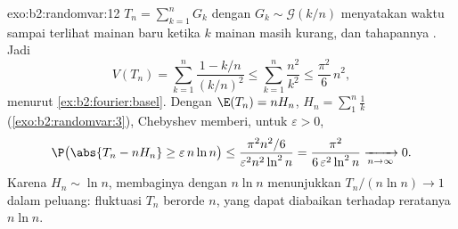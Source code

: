 \begin{solution}{exo:b2:randomvar:12}
$T_n = \sum_{k=1}^nG_k$ dengan $G_k \sim \mathcal G(k/n)$ menyatakan
waktu sampai terlihat mainan baru ketika $k$ mainan masih kurang, dan
tahapannya . Jadi
\[
V(T_n) = \sum_{k=1}^n\frac{1 - k/n}{(k/n)^2}
\leq \sum_{k=1}^n\frac{n^2}{k^2}
\leq \frac{\pi^2}6\,n^2 ,
\]
menurut \cref{ex:b2:fourier:basel}. Dengan $\E(T_n) = nH_n$, $H_n =
\sum_1^n\frac1k$ (\cref{exo:b2:randomvar:3}), Chebyshev memberi,
untuk $\varepsilon > 0$,
\[
\P\bigl(\abs{T_n - nH_n} \geq \varepsilon\,n\ln n\bigr)
\leq \frac{\pi^2n^2/6}{\varepsilon^2n^2\ln^2 n}
= \frac{\pi^2}{6\,\varepsilon^2\ln^2n}
\xrightarrow[n\to\infty]{} 0 .
\]
Karena $H_n \sim \ln n$, membaginya dengan $n\ln n$ menunjukkan
$T_n/(n\ln n) \to 1$ dalam peluang: fluktuasi
$T_n$ berorde $n$, yang dapat diabaikan terhadap reratanya $n\ln n$.
\end{solution}

